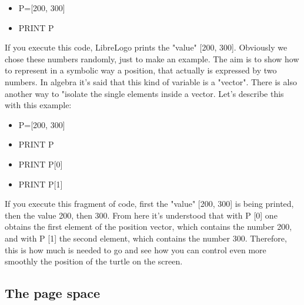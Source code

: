 \vskip 1cm

\begin{scriptsize}
\begin{minipage}{0.40\textwidth}
\begin{itemize}[itemsep=-3pt,parsep=2pt]
\item[] P=[200, 300]
\item[] PRINT P
\end{itemize}
\end{minipage}
\end{scriptsize}

\vskip 1cm

If you execute this code, LibreLogo prints the "value" [200, 300]. Obviously we chose these numbers randomly, just to make an example. The aim is to show how to represent in a symbolic way a position, that actually is expressed by two numbers. In algebra it's said that this kind of variable is a "vector". There is also another way to "isolate the single elements inside a vector. Let's describe this with this example:

\vskip 1cm

\begin{scriptsize}
\begin{minipage}{0.40\textwidth}
\begin{itemize}[itemsep=-3pt,parsep=2pt]
\item[] P=[200, 300]
\item[] PRINT P
\item[] PRINT P[0]
\item[] PRINT P[1]
\end{itemize}
\end{minipage}
\end{scriptsize}

\vskip 1cm

If you execute this fragment of code, first the "value" [200, 300] is being printed, then the value 200, then 300. From here it's understood that with P [0] one obtains the first element of the position vector, which contains the number 200, and with P [1] the second element, which contains the number 300.
Therefore, this is how much is needed to go and see how you can control even more smoothly the position of the turtle on the screen.

\subsection{The page space} \label{se:spazio-pagina}

